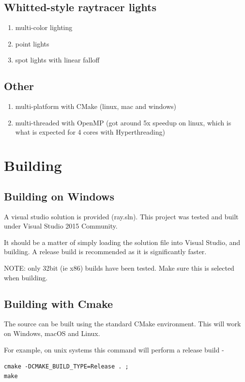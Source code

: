 \subsection{Whitted-style raytracer lights}
    \begin{enumerate}
    \item multi-color lighting
    \item point lights
    \item spot lights with linear falloff
    \end{enumerate}

\subsection{Other}
    \begin{enumerate}
    \item multi-platform with CMake (linux, mac and windows)
    \item multi-threaded with OpenMP (got around 5x speedup on linux, which is what is expected for 4 cores with Hyperthreading)
    \end{enumerate}

\section{Building}

\subsection{Building on Windows}
A visual studio solution is provided (ray.sln). This project was tested and built under Visual Studio 2015 Community. 

It should be a matter of simply loading the solution file into Visual Studio, and building. A release build is recommended as it is significantly faster.

NOTE: only 32bit (ie x86) builds have been tested. Make sure this is selected when building.

\subsection{Building with Cmake}
The source can be built using the standard CMake environment. This will work on Windows, macOS and Linux. 

For example, on unix systems this command will perform a release build -

\verb|cmake -DCMAKE_BUILD_TYPE=Release . ;| \\
\verb|make|

